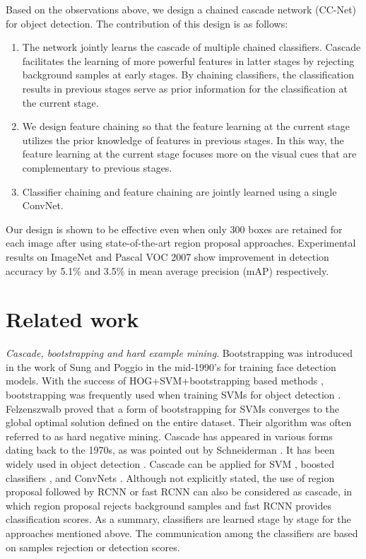 \documentclass[10pt,twocolumn,letterpaper]{article}
\begin{document}
Based on the observations above, we design a chained cascade network (CC-Net) for object detection. The contribution of this design is as follows:
\begin{enumerate}
\item The network jointly learns the cascade of multiple chained classifiers. Cascade facilitates the learning of more powerful features in latter stages by rejecting background samples at early stages.
 By chaining classifiers, the classification results in previous stages serve as prior information for the classification at the current stage.
\item We design feature chaining so that the feature learning at the current stage utilizes the prior knowledge of features in previous stages. In this way, the feature learning at the current stage focuses more on the visual cues that are complementary to previous stages.
\item Classifier chaining and feature chaining are jointly learned using a single ConvNet.
\end{enumerate}
Our design is shown to be effective even when only 300 boxes are retained for each image after using state-of-the-art region proposal approaches.
Experimental results on ImageNet and Pascal VOC 2007 show improvement in detection accuracy by 5.1\% and 3.5\% in mean average precision (mAP) respectively.


\section{Related work}
\emph{Cascade, bootstrapping and hard example mining}. Bootstrapping was introduced in the work of Sung
and Poggio \cite{sung1996learning} in the mid-1990’s for training face detection models. With the success of HOG+SVM+bootstrapping based methods \cite{Dalal:HOG, LatSVMObj}, bootstrapping was frequently
used when training SVMs for object detection \cite{girshick2014rich}. Felzenszwalb \etal \cite{LatSVMObj} proved that a form of bootstrapping
for SVMs converges to the global optimal solution defined on the entire dataset. Their algorithm was often
referred to as hard negative mining.
Cascade has appeared in various forms dating back to the 1970s, as was pointed out by Schneiderman \cite{schneiderman2004feature}.
It has been widely used in object detection \cite{Pedersoli:C2FObj2, Felzenszwalb:cascade10,bourdev2005robust,dollar2014fast,li2004floatboost}. Cascade can be applied for SVM \cite{Pedersoli:C2FObj2, Felzenszwalb:cascade10}, boosted classifiers \cite{dollar2014fast,li2004floatboost,xiao2003boosting}, and ConvNets \cite{yang2016craft}. Although not explicitly stated, the use of region proposal followed by RCNN or fast RCNN can also be considered as cascade, in which region proposal rejects background samples and fast RCNN provides classification scores. As a summary,  classifiers are learned stage by stage for the approaches mentioned above. The communication among the classifiers are based on samples rejection or detection scores.
\end{document}

